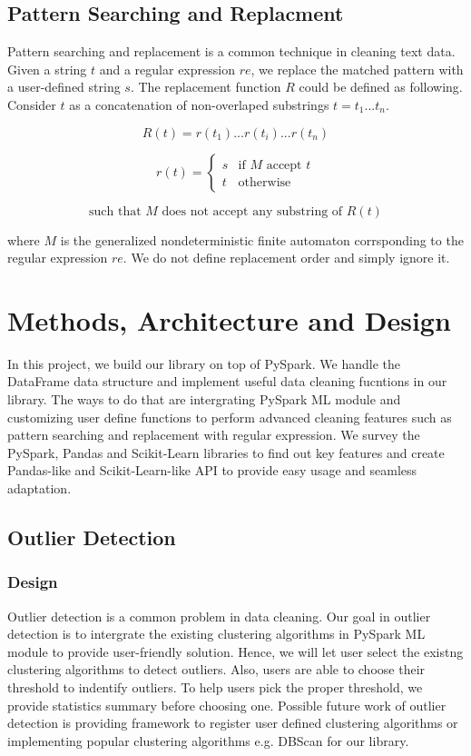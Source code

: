\documentclass[sigconf]{acmart}
\begin{document}
\subsection{Pattern Searching and Replacment}
Pattern searching and replacement is a common technique in cleaning text data. Given a string $t$ and a regular expression\cite{theory_com} $re$, we replace the matched pattern with a user-defined string $s$. The replacement function $R$ could be defined as following.
Consider $t$ as a concatenation of non-overlaped substrings $t = t_1...t_n$.

\[ R(t) =  r(t_1)...r(t_i)...r(t_n)\]

\[r(t) = \begin{cases} s & \text{if $M$ accept $t$} \\ t & \text{otherwise} \end{cases}\]

\[\text{such that $M$ does not accept any substring of } R(t)\]

where $M$ is the generalized nondeterministic finite automaton\cite{theory_com} corrsponding to the regular expression $re$. We do not define replacement order and simply ignore it.


\section{Methods, Architecture and Design}
In this project, we build our library on top of PySpark. We handle the DataFrame data structure and implement useful data cleaning fucntions in our library. The ways to do that are intergrating PySpark ML module and customizing user define functions to perform advanced cleaning features such as pattern searching and replacement with regular expression. We survey the PySpark\cite{pyspark}, Pandas\cite{pandas} and Scikit-Learn\cite{scikit-learn} libraries to find out key features and create Pandas-like and Scikit-Learn-like API to provide easy usage and seamless adaptation.

\subsection{Outlier Detection}
\subsubsection{Design} 
Outlier detection is a common problem in data cleaning. Our goal in outlier detection is to intergrate the existing clustering algorithms in PySpark ML module to provide user-friendly solution. Hence, we will let user select the existng clustering algorithms to detect outliers. Also, users are able to choose their threshold to indentify outliers. To help users pick the proper threshold, we provide statistics summary before choosing one. Possible future work of outlier detection is providing framework to register user defined clustering algorithms or implementing popular clustering algorithms e.g. DBScan\cite{DBScan} for our library.
\end{document}

